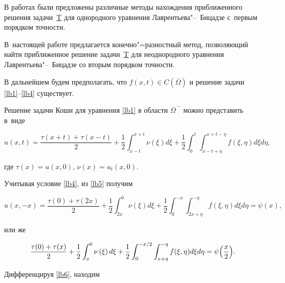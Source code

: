 \smallskip



В работах \cite{balk:c14, balk:c15, balk:c16, balk:c17, balk:c18, balk:c19} были предложены различные методы нахождения приближенного решения задачи~\hyperlink{taskT}{T} для однородного уравнения Лаврентьева"--~Бицадзе с~первым порядком точности. 

В~настоящей работе предлагается конечно"=разностный метод, позволяющий найти приближенное решение задачи~\hyperlink{taskT}{T} для неоднородного уравнения Лаврентьева"--~Бицадзе со вторым порядком точности.



В дальнейшем будем предполагать, что $f(x,t) \in C(\overline{\Omega})$ и решение задачи \eqref{lb1}--\eqref{lb4} существует. 

Решение задачи Коши для уравнения \eqref{lb1} в области $\overline{\Omega}^{\,-}$ можно представить в~виде

\begin{equation}

\label{lb5}

u(x, t)=\frac{\tau(x+t)+\tau(x-t)}{2}+\frac{1}{2} \int _{x-t}^{x+t} \nu\left(\xi\right) d \xi+

\frac{1}{2} \int _{0}^{t}\int _{x-t+\eta}^{x+t-\eta} f (\xi,\eta) d\xi d\eta,

\end{equation}

где $\tau(x)=u(x, 0)$, $\nu(x)=u_t(x, 0).$

Учитывая условие \eqref{lb4}, из \eqref{lb5} получим

$$

u(x,-x)=\frac{\tau(0)+\tau\left(2x\right)}{2}+\frac{1}{2}\int _{2x}^{0}\nu\left(\xi\right) d \xi+

\frac{1}{2}\int _{0}^{-x}\int _{2x+\eta}^{-\eta}f (\xi,\eta) d\xi d\eta=\psi(x),

$$

или же

\begin{equation}

\label{lb6}

\frac{\tau(0)+\tau(x)}{2}+\frac{1}{2}\int _{x}^{0}\nu\left(\xi\right) d \xi+

\frac{1}{2}\int _{0}^{-x/2}\int _{x+\eta}^{-\eta}f (\xi,\eta) d\xi d\eta=\psi\Bigl(\frac{x}{2}\Bigr).

\end{equation}

Дифференцируя \eqref{lb6}, находим

